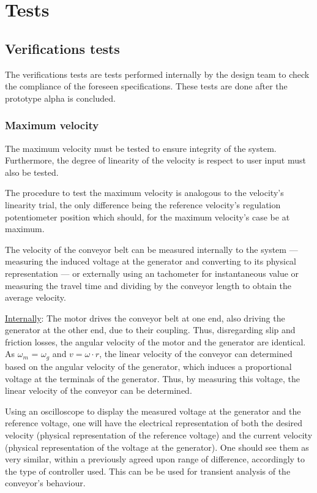 \section{Tests}
\label{sec:org3e2776f}
\subsection{Verifications tests}
\label{sec:orge9c79e2}
The verifications tests are tests performed internally by the design team to
check the compliance of the foreseen specifications. These tests are done after
the prototype alpha is concluded.

\subsubsection{Maximum velocity}
\label{sec:org532616f}
The maximum velocity must be tested to ensure integrity of the
system. Furthermore, the degree of linearity of the velocity is respect to user
input must also be tested.

The procedure to test the maximum velocity is analogous to the velocity's
linearity trial, the only difference being the reference velocity’s regulation potentiometer position which should, for the maximum velocity’s case be at maximum.

The velocity of the conveyor belt can be measured internally to the system ---
measuring the induced voltage at the generator and converting to its physical
representation --- or externally using an tachometer for instantaneous value or
measuring the travel time and dividing by the conveyor length to obtain the
average velocity.

\uline{Internally}: The motor drives the conveyor belt at one end, also driving the
generator at the other end, due to their coupling. Thus, disregarding slip and
friction losses, the angular velocity of the motor and the generator are
identical. As \(\omega_m\) = \(\omega_g\) and \(v = \omega \cdot r\), the linear velocity of the conveyor can determined based on the angular velocity of the generator, which induces a proportional voltage at the terminals of the generator. Thus, by measuring this voltage, the linear velocity of the conveyor can be determined.

Using an oscilloscope to display the measured voltage at the generator and the
reference voltage, one will have the electrical representation of both the
desired velocity (physical representation of the reference voltage) and the
current velocity (physical representation of the voltage at the generator). 
One should see them as very similar, within a previously agreed upon range of
difference, accordingly to the type of controller used. This can be be used for
transient analysis of the conveyor's behaviour.

